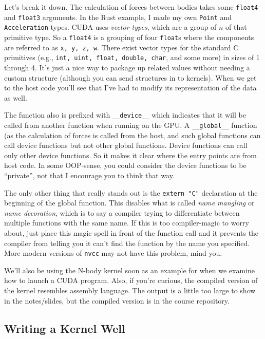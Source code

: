 Let's break it down. The calculation of forces between bodies takes some \texttt{float4} and \texttt{float3} arguments. In the Rust example, I made my own \texttt{Point} and \texttt{Acceleration} types. CUDA uses \textit{vector types}, which are a group of $n$ of that primitive type. So a \texttt{float4} is a grouping of four \texttt{float}s where the components are referred to as \texttt{x, y, z, w}. There exist vector types for the standard C primitives (e.g., \texttt{int, uint, float, double, char}, and some more) in sizes of 1 through 4. It's just a nice way to package up related values without needing a custom structure (although you can send structures in to kernels). When we get to the host code you'll see that I've had to modify its representation of the data as well.

The function also is prefixed with \texttt{\_\_device\_\_} which indicates that it will be called from another function when running on the GPU. A \texttt{\_\_global\_\_} function (as the calculation of forces is called from the host, and such global functions can call device functions but not other global functions. Device functions can call only other device functions. So it makes it clear where the entry points are from host code. In some OOP-sense, you could consider the device functions to be ``private'', not that I encourage you to think that way.

The only other thing that really stands out is the \texttt{extern "C"} declaration at the beginning of the global function. This disables what is called \textit{name mangling} or \textit{name decoration}, which is to say a compiler trying to differentiate between multiple functions with the same name. If this is too compiler-magic to worry about, just place this magic spell in front of the function call and it prevents the compiler from telling you it can't find the function by the name you specified. More modern versions of \texttt{nvcc} may not have this problem, mind you.

We'll also be using the N-body kernel soon as an example for when we examine how to launch a CUDA program. Also, if you're curious, the compiled version of the kernel resembles assembly language. The output is a little too large to show in the notes/slides, but the compiled version is in the course repository.

\subsection*{Writing a Kernel Well}

